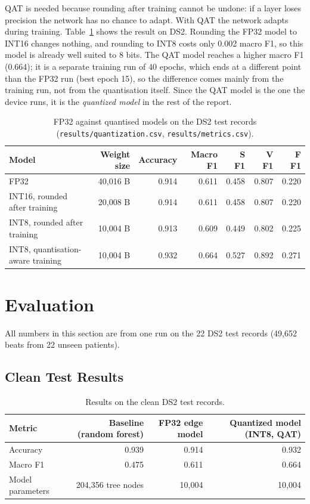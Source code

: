 \documentclass[11pt,a4paper]{article}
\newcommand{\code}[1]{\texttt{#1}}
\begin{document}
QAT is needed because rounding after training cannot be undone: if a layer loses precision the network has no chance to adapt. With QAT the network adapts during training. Table~\ref{tab:quant} shows the result on DS2. Rounding the FP32 model to INT16 changes nothing, and rounding to INT8 costs only 0.002 macro F1, so this model is already well suited to 8 bits. The QAT model reaches a higher macro F1 (0.664); it is a separate training run of 40 epochs, which ends at a different point than the FP32 run (best epoch 15), so the difference comes mainly from the training run, not from the quantisation itself. Since the QAT model is the one the device runs, it is the \emph{quantized model} in the rest of the report.

\begin{table}[H]
\centering
\small
\caption{FP32 against quantised models on the DS2 test records (\code{results/quantization.csv}, \code{results/metrics.csv}).}
\label{tab:quant}
\begin{tabular}{@{} l r r r r r r @{}}
\toprule
Model & Weight size & Accuracy & Macro F1 & S F1 & V F1 & F F1 \\
\midrule
FP32 & 40,016 B & 0.914 & 0.611 & 0.458 & 0.807 & 0.220 \\
INT16, rounded after training & 20,008 B & 0.914 & 0.611 & 0.458 & 0.807 & 0.220 \\
INT8, rounded after training & 10,004 B & 0.913 & 0.609 & 0.449 & 0.802 & 0.225 \\
INT8, quantisation-aware training & 10,004 B & 0.932 & 0.664 & 0.527 & 0.892 & 0.271 \\
\bottomrule
\end{tabular}
\end{table}

\section{Evaluation}
\label{sec:evaluation}

All numbers in this section are from one run on the 22 DS2 test records (49,652 beats from 22 unseen patients).

\subsection{Clean Test Results}

\begin{table}[H]
\centering
\small
\caption{Results on the clean DS2 test records.}
\label{tab:clean}
\begin{tabular}{@{} l r r r @{}}
\toprule
Metric & Baseline (random forest) & FP32 edge model & Quantized model (INT8, QAT) \\
\midrule
Accuracy & 0.939 & 0.914 & 0.932 \\
Macro F1 & 0.475 & 0.611 & 0.664 \\
Model parameters & 204,356 tree nodes & 10,004 & 10,004 \\
\bottomrule
\end{tabular}
\end{table}
\end{document}
